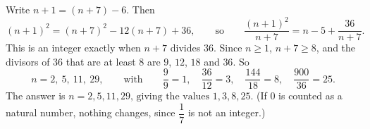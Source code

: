 Write $n+1=(n+7)-6$. Then
\[(n+1)^2=(n+7)^2-12(n+7)+36,\qquad\text{so}\qquad\dfrac{(n+1)^2}{n+7}=n-5+\dfrac{36}{n+7}.\]
This is an integer exactly when $n+7$ divides $36$. Since $n\ge1$, $n+7\ge8$, and the divisors of $36$ that are at least $8$ are $9$, $12$, $18$ and $36$. So
\[n=2,\ 5,\ 11,\ 29,\qquad\text{with}\qquad\dfrac{9}{9}=1,\quad\dfrac{36}{12}=3,\quad\dfrac{144}{18}=8,\quad\dfrac{900}{36}=25.\]
The answer is $\boxed{n=2,5,11,29\text{, giving the values }1,3,8,25}$. (If $0$ is counted as a natural number, nothing changes, since $\dfrac17$ is not an integer.)
